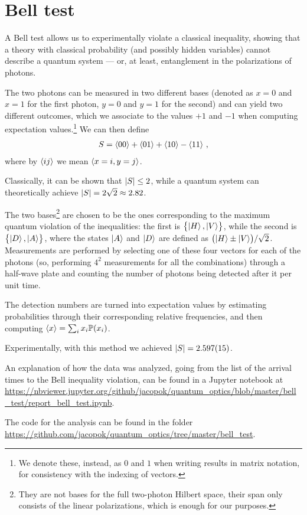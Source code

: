 \documentclass[main.tex]{subfiles}
\begin{document}
\section{Bell test}

A Bell test allows us to experimentally violate a classical inequality, showing that a theory with classical probability (and possibly hidden variables) cannot describe a quantum system --- or, at least, entanglement in the polarizations of photons. 

The two photons can be measured in two different bases (denoted as \(x=0\) and \(x=1\) for the first photon, \(y=0\) and \(y=1\) for the second) and can yield two different outcomes, which we associate to the values \(+1\) and \(-1\) when computing expectation values.\footnote{We denote these, instead, as \(0\) and \(1\) when writing results in matrix notation, for consistency with the indexing of vectors.} We can then define 
%
\begin{align}
S = \expval{00} + \expval{01}+ \expval{10} - \expval{11}
\,,
\end{align}
%
where by \(\expval{ij}\) we mean \(\expval{x=i, y=j}\). 

Classically, it can be shown that \(\abs{S} \leq 2\), while a quantum system can theoretically achieve \(\abs{S} = 2 \sqrt{2} \approx \num{2.82}\). 

The two bases\footnote{They are not bases for the full two-photon Hilbert space, their span only consists of the linear polarizations, which is enough for our purposes. } are chosen to be the ones corresponding to the maximum quantum violation of the inequalities: the first is \(\qty{\ket{H}, \ket{V}}\), while the second is \(\qty{\ket{D}, \ket{A}}\), where the states \(\ket{A}\) and \(\ket{D}\) are defined as \(\qty(\ket{H} \pm \ket{V}) / \sqrt{2}\). 
Measurements are performed by selecting one of these four vectors for each of the photons (so, performing \(4^2\) measurements for all the combinations) through a half-wave plate and counting the number of photons being detected after it per unit time. 

The detection numbers are turned into expectation values by estimating probabilities through their corresponding relative frequencies, and then computing \(\expval{x} = \sum_i x_i \mathbb{P}(x_i)\). 

Experimentally, with this method we achieved \(\abs{S} = \num{2.597(15)}\).

An explanation of how the data was analyzed, going from the list of the arrival times to the Bell inequality violation, can be found in a Jupyter notebook at \url{https://nbviewer.jupyter.org/github/jacopok/quantum_optics/blob/master/bell_test/report_bell_test.ipynb}.

The code for the analysis can be found in the folder \url{https://github.com/jacopok/quantum_optics/tree/master/bell_test}. 
\end{document}
